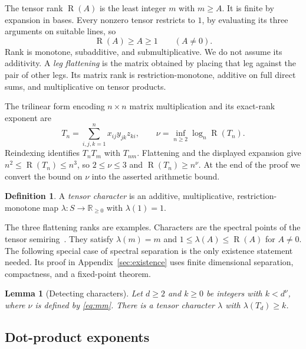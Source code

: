 \documentclass[11pt]{article}
\newtheorem{lemma}[theorem]{Lemma}
\theoremstyle{definition}
\newtheorem{definition}[theorem]{Definition}
\theoremstyle{remark}
\DeclareMathOperator{\rank}{R}
\newcommand{\R}{\mathbb R}
\numberwithin{equation}{section}
\begin{document}
The tensor rank $\rank(A)$ is the least integer $m$ with $m\geq A$.
It is finite by expansion in bases. Every nonzero tensor restricts to
$1$, by evaluating its three arguments on suitable lines, so
\begin{equation}\label{eq:boundedness}
 \rank(A)\geq A\geq1\qquad(A\ne0).
\end{equation}
Rank is monotone, subadditive, and submultiplicative. We do not assume
its additivity. A \emph{leg flattening} is the matrix obtained by
placing that leg against the pair of other legs. Its matrix rank is
restriction-monotone, additive on full direct sums, and multiplicative
on tensor products.

The trilinear form encoding $n\times n$ matrix multiplication and its
exact-rank exponent are
\begin{equation}\label{eq:mm}
 T_n=\sum_{i,j,k=1}^n x_{ij}y_{jk}z_{ki},
 \qquad
 \nu=\inf_{n\geq2}\log_n\rank(T_n).
\end{equation}
Reindexing identifies $T_nT_m$ with $T_{nm}$. Flattening and the displayed
expansion give $n^2\leq\rank(T_n)\leq n^3$, so $2\leq\nu\leq3$ and
$\rank(T_n)\geq n^\nu$. At the end of the proof we convert the bound
on $\nu$ into the asserted arithmetic bound.

\begin{definition}\label{def:character}
A \emph{tensor character} is an additive, multiplicative,
restriction-monotone map $\lambda:S\to\R_{\geq0}$ with
$\lambda(1)=1$.
\end{definition}

The three flattening ranks are examples. Characters are the spectral
points of the tensor semiring~\cite{Str88,CVZ}.
They satisfy $\lambda(m)=m$ and
$1\leq\lambda(A)\leq\rank(A)$ for $A\ne0$.
The following special case of spectral separation is the only existence
statement needed. Its proof in Appendix~\ref{sec:existence} uses finite
dimensional separation, compactness, and a fixed-point theorem.

\begin{lemma}[Detecting characters]\label{lem:existence}
Let $d\geq2$ and $k\geq0$ be integers with $k<d^\nu$, where $\nu$ is
defined by \eqref{eq:mm}. There is a tensor character $\lambda$ with
$\lambda(T_d)\geq k$.
\end{lemma}

\subsection{Dot-product exponents}
\end{document}
